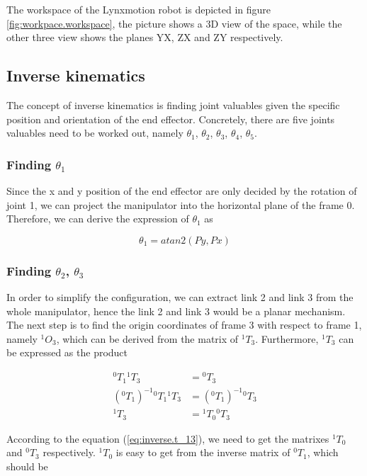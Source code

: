 \documentclass{article}
\newcommand{\T}[2]{{}^{#1}T_{#2}}
\renewcommand{\O}[2]{{}^{#1}O_{#2}}
\begin{document}
The workspace of the Lynxmotion robot is depicted in figure \ref{fig:workpace.workspace}, the picture shows a 3D view of the space, while the other three view shows the planes YX, ZX and ZY respectively.

\subsection{Inverse kinematics}
The concept of inverse kinematics is finding joint valuables given the specific position and orientation of the end effector. Concretely, there are five joints valuables need to be worked out, namely  $\theta_1$,  $\theta_2$,  $\theta_3$,  $\theta_4$,  $\theta_5$.

\subsubsection{Finding  $\theta_1$}
Since the x and y position of the end effector are only decided by the rotation of joint 1, we can project the manipulator into the horizontal plane of the frame 0. Therefore, we can derive the expression of  $\theta_1$ as

\begin{equation}
\theta_1 = atan2(Py, Px)
\end{equation}

\subsubsection{Finding  $\theta_2$, $\theta_3$}
In order to simplify the configuration, we can extract link 2 and link 3 from the whole manipulator, hence the link 2 and link 3 would be a planar mechanism. The next step is to find the origin coordinates of frame 3 with respect to frame 1, namely $\O{1}{3}$, which can be derived from the matrix of $\T{1}{3}$. Furthermore, $\T{1}{3}$ can be expressed as the product

\begin{align}
\label{eq:inverse.t_13}
\T{0}{1}\T{1}{3} & = \T{0}{3} \nonumber \\
{(\T{0}{1})}^{-1}\T{0}{1}\T{1}{3}& = {(\T{0}{1})}^{-1} \T{0}{3} \nonumber \\
\T{1}{3} & = \T{1}{0} \T{0}{3}
\end{align}

According to the equation (\ref{eq:inverse.t_13}), we need to get the matrixes $\T{1}{0}$ and $\T{0}{3}$ respectively. $\T{1}{0}$ is easy to get from the inverse matrix of $\T{0}{1}$, which should be 
\end{document}
